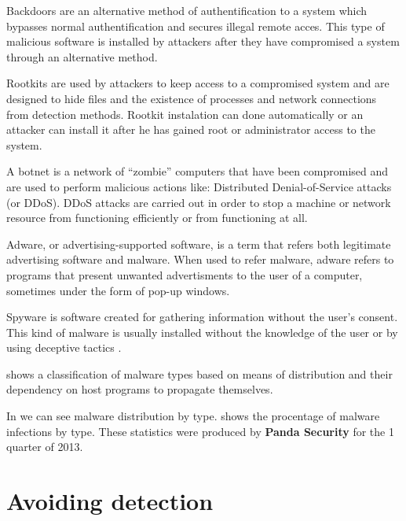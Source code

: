 Backdoors are an alternative method of authentification to a system which bypasses normal authentification and secures illegal remote acces. This type of malicious software is installed by attackers after they have compromised a system through an alternative method.

Rootkits are used by attackers to keep access to a compromised system and are designed to hide files and the existence of processes and network connections from detection methods. Rootkit instalation can done automatically or an attacker can install it after he has gained root or administrator access to the system.

A botnet is a network of ``zombie'' computers that have been compromised and are used to perform malicious actions like: Distributed Denial-of-Service attacks (or DDoS). DDoS attacks are carried out in order to stop a machine or network resource from functioning efficiently or from functioning at all.

Adware, or advertising-supported software, is a term that refers both legitimate advertising software and malware. When used to refer malware, adware refers to programs that present unwanted advertisments to the user of a computer, sometimes under the form of pop-up windows.

Spyware is software created for gathering information without the user's consent. This kind of malware is usually installed without the knowledge of the user or by using deceptive tactics \cite{mal-behavior-analysis}.

 shows a classification of malware types based on means of distribution and their dependency on host programs to propagate themselves.


In  we can see malware distribution by type.  shows the procentage of malware infections by type. These statistics were produced by \textbf{Panda Security} for the 1 quarter of 2013. 



\section{Avoiding detection}
\label{sec:avoid-det}

